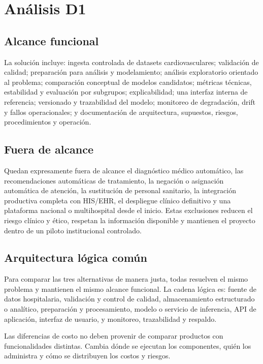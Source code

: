 \section{Análisis D1}

\subsection{Alcance funcional}

La solución incluye: ingesta controlada de datasets cardiovasculares; validación de calidad; preparación para análisis y modelamiento; análisis exploratorio orientado al problema; comparación conceptual de modelos candidatos; métricas técnicas, estabilidad y evaluación por subgrupos; explicabilidad; una interfaz interna de referencia; versionado y trazabilidad del modelo; monitoreo de degradación, drift y fallos operacionales; y documentación de arquitectura, supuestos, riesgos, procedimientos y operación.

\subsection{Fuera de alcance}

Quedan expresamente fuera de alcance el diagnóstico médico automático, las recomendaciones automáticas de tratamiento, la negación o asignación automática de atención, la sustitución de personal sanitario, la integración productiva completa con HIS/EHR, el despliegue clínico definitivo y una plataforma nacional o multihospital desde el inicio. Estas exclusiones reducen el riesgo clínico y ético, respetan la información disponible y mantienen el proyecto dentro de un piloto institucional controlado.

\subsection{Arquitectura lógica común}

Para comparar las tres alternativas de manera justa, todas resuelven el mismo problema y mantienen el mismo alcance funcional. La cadena lógica es: fuente de datos hospitalaria, validación y control de calidad, almacenamiento estructurado o analítico, preparación y procesamiento, modelo o servicio de inferencia, API de aplicación, interfaz de usuario, y monitoreo, trazabilidad y respaldo.

Las diferencias de costo no deben provenir de comparar productos con funcionalidades distintas. Cambia dónde se ejecutan los componentes, quién los administra y cómo se distribuyen los costos y riesgos.
